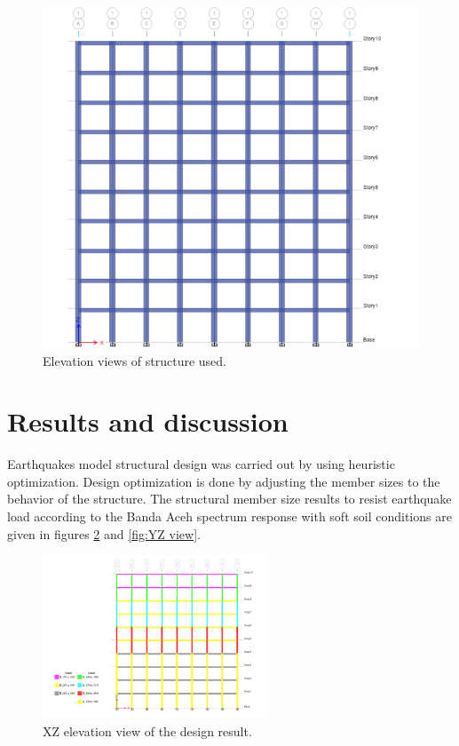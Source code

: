 \documentclass{cup-pan}
\begin{document}
\begin{figure}[H]
\begin{minipage}{0.6\textwidth}
\includegraphics[width=\linewidth]{fig6.png}
\end{minipage}

\caption{Elevation views of structure used.}
\label{fig:elevation}
\end{figure}



\section{Results and discussion}
\label{sec:results}

Earthquakes model structural design was carried out by using heuristic optimization. Design optimization is done by adjusting the member sizes to the behavior of the structure. The structural member size results to resist earthquake load according to the Banda Aceh spectrum response with soft soil conditions are given in figures \ref{fig:XZ view} and \ref{fig:YZ view}.

\begin{figure}[H]
\centering
\includegraphics[width=0.6\textwidth]{Picture6.png}
\caption{XZ elevation view of the design result.}
\label{fig:XZ view}
\end{figure}
\end{document}

